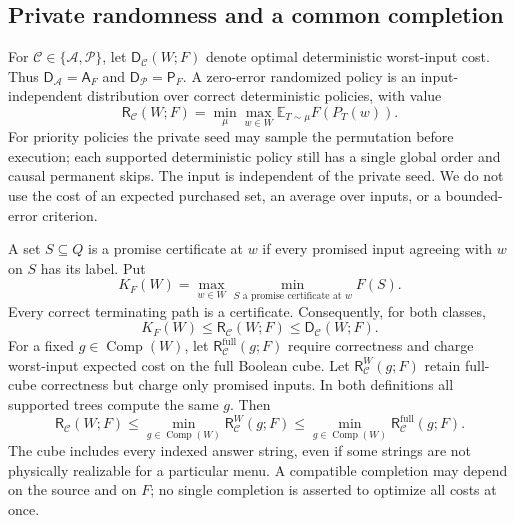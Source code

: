 \documentclass[pdflatex,sn-mathphys-num]{sn-jnl}
\newcommand{\A}{\mathsf{A}}
\newcommand{\Pcost}{\mathsf{P}}
\newcommand{\Comp}{\operatorname{Comp}}
\newcommand{\DR}{\mathsf{D}}
\newcommand{\RR}{\mathsf{R}}
\theoremstyle{thmstyleone}
\theoremstyle{thmstylethree}
\theoremstyle{thmstyletwo}
\begin{document}
\subsection{Private randomness and a common completion}
For $\mathcal C\in\{\mathcal A,\mathcal P\}$, let $\DR_{\mathcal C}(W;F)$ denote optimal deterministic worst-input cost. Thus $\DR_{\mathcal A}=\A_F$ and $\DR_{\mathcal P}=\Pcost_F$. A zero-error randomized policy is an input-independent distribution over correct deterministic policies, with value
\[
 \RR_{\mathcal C}(W;F)=\min_{\mu}\max_{w\in W}
       \mathbb E_{T\sim\mu} F(P_T(w)).
\]
For priority policies the private seed may sample the permutation before execution; each supported deterministic policy still has a single global order and causal permanent skips. The input is independent of the private seed. We do not use the cost of an expected purchased set, an average over inputs, or a bounded-error criterion.

A set $S\subseteq Q$ is a promise certificate at $w$ if every promised input agreeing with $w$ on $S$ has its label. Put
\[
 K_F(W)=\max_{w\in W}\min_{S\text{ a promise certificate at }w}F(S).
\]
Every correct terminating path is a certificate. Consequently, for both classes,
\begin{equation}\label{eq:random-certificate-lower}
 K_F(W)\leq\RR_{\mathcal C}(W;F)\leq\DR_{\mathcal C}(W;F).
\end{equation}
For a fixed $g\in\Comp(W)$, let $\RR^{\mathrm{full}}_{\mathcal C}(g;F)$ require correctness and charge worst-input expected cost on the full Boolean cube. Let $\RR^W_{\mathcal C}(g;F)$ retain full-cube correctness but charge only promised inputs. In both definitions all supported trees compute the same $g$. Then
\begin{equation}\label{eq:random-completion-chain}
 \RR_{\mathcal C}(W;F)\leq\min_{g\in\Comp(W)}\RR^W_{\mathcal C}(g;F)
 \leq\min_{g\in\Comp(W)}\RR^{\mathrm{full}}_{\mathcal C}(g;F).
\end{equation}
The cube includes every indexed answer string, even if some strings are not physically realizable for a particular menu. A compatible completion may depend on the source and on $F$; no single completion is asserted to optimize all costs at once.
\end{document}
